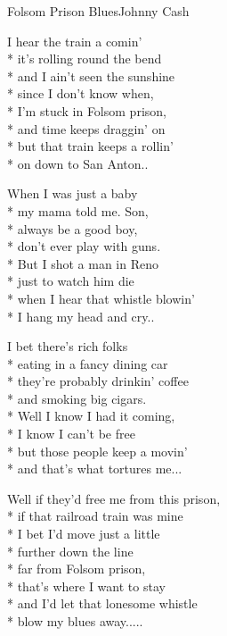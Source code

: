 \documentclass[10.5pt]{book}
\begin{document}
\begin{poem}{Folsom Prison Blues}{Johnny Cash}

\settowidth{\versewidth}{Well if they'd free me from this prison,}

I hear the train a comin'\\*
it's rolling round the bend\\*
and I ain't seen the sunshine\\*
since I don't know when,\\*
I'm stuck in Folsom prison,\\*
and time keeps draggin' on\\*
but that train keeps a rollin'\\*
on down to San Anton..

When I was just a baby\\*
my mama told me. Son,\\*
always be a good boy,\\*
don't ever play with guns.\\*
But I shot a man in Reno\\*
just to watch him die\\*
when I hear that whistle blowin'\\*
I hang my head and cry..

I bet there's rich folks\\*
eating in a fancy dining car\\*
they're probably drinkin' coffee\\*
and smoking big cigars.\\*
Well I know I had it coming,\\*
I know I can't be free\\*
but those people keep a movin'\\*
and that's what tortures me...

Well if they'd free me from this prison,\\*
if that railroad train was mine\\*
I bet I'd move just a little\\*
further down the line\\*
far from Folsom prison,\\*
that's where I want to stay\\*
and I'd let that lonesome whistle\\*
blow my blues away.....

\end{poem}
\end{document}
